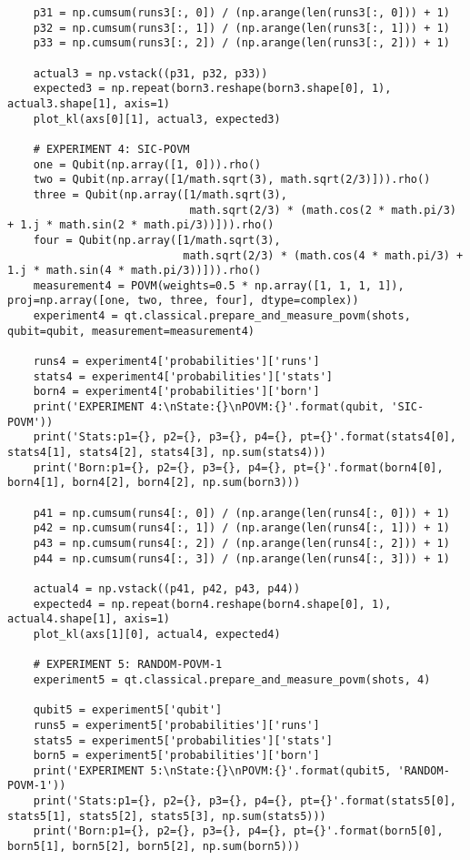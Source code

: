 \begin{verbatim}
    p31 = np.cumsum(runs3[:, 0]) / (np.arange(len(runs3[:, 0])) + 1)
    p32 = np.cumsum(runs3[:, 1]) / (np.arange(len(runs3[:, 1])) + 1)
    p33 = np.cumsum(runs3[:, 2]) / (np.arange(len(runs3[:, 2])) + 1)

    actual3 = np.vstack((p31, p32, p33))
    expected3 = np.repeat(born3.reshape(born3.shape[0], 1), actual3.shape[1], axis=1)
    plot_kl(axs[0][1], actual3, expected3)

    # EXPERIMENT 4: SIC-POVM
    one = Qubit(np.array([1, 0])).rho()
    two = Qubit(np.array([1/math.sqrt(3), math.sqrt(2/3)])).rho()
    three = Qubit(np.array([1/math.sqrt(3),
                            math.sqrt(2/3) * (math.cos(2 * math.pi/3) + 1.j * math.sin(2 * math.pi/3))])).rho()
    four = Qubit(np.array([1/math.sqrt(3),
                           math.sqrt(2/3) * (math.cos(4 * math.pi/3) + 1.j * math.sin(4 * math.pi/3))])).rho()
    measurement4 = POVM(weights=0.5 * np.array([1, 1, 1, 1]), proj=np.array([one, two, three, four], dtype=complex))
    experiment4 = qt.classical.prepare_and_measure_povm(shots, qubit=qubit, measurement=measurement4)

    runs4 = experiment4['probabilities']['runs']
    stats4 = experiment4['probabilities']['stats']
    born4 = experiment4['probabilities']['born']
    print('EXPERIMENT 4:\nState:{}\nPOVM:{}'.format(qubit, 'SIC-POVM'))
    print('Stats:p1={}, p2={}, p3={}, p4={}, pt={}'.format(stats4[0], stats4[1], stats4[2], stats4[3], np.sum(stats4)))
    print('Born:p1={}, p2={}, p3={}, p4={}, pt={}'.format(born4[0], born4[1], born4[2], born4[2], np.sum(born3)))

    p41 = np.cumsum(runs4[:, 0]) / (np.arange(len(runs4[:, 0])) + 1)
    p42 = np.cumsum(runs4[:, 1]) / (np.arange(len(runs4[:, 1])) + 1)
    p43 = np.cumsum(runs4[:, 2]) / (np.arange(len(runs4[:, 2])) + 1)
    p44 = np.cumsum(runs4[:, 3]) / (np.arange(len(runs4[:, 3])) + 1)

    actual4 = np.vstack((p41, p42, p43, p44))
    expected4 = np.repeat(born4.reshape(born4.shape[0], 1), actual4.shape[1], axis=1)
    plot_kl(axs[1][0], actual4, expected4)

    # EXPERIMENT 5: RANDOM-POVM-1
    experiment5 = qt.classical.prepare_and_measure_povm(shots, 4)

    qubit5 = experiment5['qubit']
    runs5 = experiment5['probabilities']['runs']
    stats5 = experiment5['probabilities']['stats']
    born5 = experiment5['probabilities']['born']
    print('EXPERIMENT 5:\nState:{}\nPOVM:{}'.format(qubit5, 'RANDOM-POVM-1'))
    print('Stats:p1={}, p2={}, p3={}, p4={}, pt={}'.format(stats5[0], stats5[1], stats5[2], stats5[3], np.sum(stats5)))
    print('Born:p1={}, p2={}, p3={}, p4={}, pt={}'.format(born5[0], born5[1], born5[2], born5[2], np.sum(born5)))


\end{verbatim}
